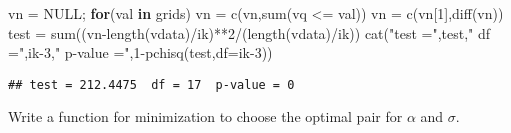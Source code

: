 \documentclass[
]{article}
\newenvironment{Shaded}{\begin{snugshade}}{\end{snugshade}}
\newcommand{\AttributeTok}[1]{\textcolor[rgb]{0.77,0.63,0.00}{#1}}
\newcommand{\ConstantTok}[1]{\textcolor[rgb]{0.00,0.00,0.00}{#1}}
\newcommand{\ControlFlowTok}[1]{\textcolor[rgb]{0.13,0.29,0.53}{\textbf{#1}}}
\newcommand{\DecValTok}[1]{\textcolor[rgb]{0.00,0.00,0.81}{#1}}
\newcommand{\FunctionTok}[1]{\textcolor[rgb]{0.00,0.00,0.00}{#1}}
\newcommand{\NormalTok}[1]{#1}
\newcommand{\OtherTok}[1]{\textcolor[rgb]{0.56,0.35,0.01}{#1}}
\newcommand{\SpecialCharTok}[1]{\textcolor[rgb]{0.00,0.00,0.00}{#1}}
\newcommand{\StringTok}[1]{\textcolor[rgb]{0.31,0.60,0.02}{#1}}
\begin{document}
\begin{Shaded}
\begin{Highlighting}[]
\NormalTok{vn }\OtherTok{=} \ConstantTok{NULL}\NormalTok{; }\ControlFlowTok{for}\NormalTok{(val }\ControlFlowTok{in}\NormalTok{ grids) vn }\OtherTok{=} \FunctionTok{c}\NormalTok{(vn,}\FunctionTok{sum}\NormalTok{(vq }\SpecialCharTok{\textless{}=}\NormalTok{ val))}
\NormalTok{vn }\OtherTok{=} \FunctionTok{c}\NormalTok{(vn[}\DecValTok{1}\NormalTok{],}\FunctionTok{diff}\NormalTok{(vn))}
\NormalTok{test }\OtherTok{=} \FunctionTok{sum}\NormalTok{((vn}\SpecialCharTok{{-}}\FunctionTok{length}\NormalTok{(vdata)}\SpecialCharTok{/}\NormalTok{ik)}\SpecialCharTok{**}\DecValTok{2}\SpecialCharTok{/}\NormalTok{(}\FunctionTok{length}\NormalTok{(vdata)}\SpecialCharTok{/}\NormalTok{ik))}
\FunctionTok{cat}\NormalTok{(}\StringTok{"test ="}\NormalTok{,test,}\StringTok{" df ="}\NormalTok{,ik}\DecValTok{{-}3}\NormalTok{,}\StringTok{" p{-}value ="}\NormalTok{,}\DecValTok{1}\SpecialCharTok{{-}}\FunctionTok{pchisq}\NormalTok{(test,}\AttributeTok{df=}\NormalTok{ik}\DecValTok{{-}3}\NormalTok{))}
\end{Highlighting}
\end{Shaded}

\begin{verbatim}
## test = 212.4475  df = 17  p-value = 0
\end{verbatim}

Write a function for minimization to choose the optimal pair for
\(\alpha\) and \(\sigma\).
\end{document}
